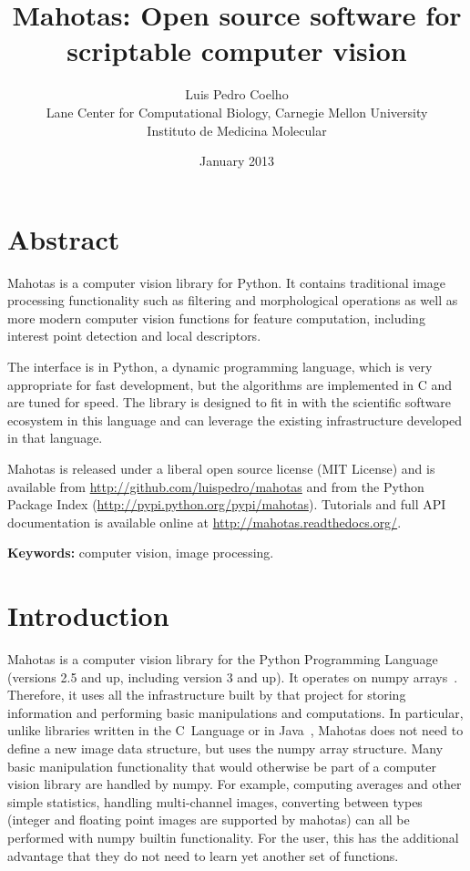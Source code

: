\documentclass{scrartcl}
\title{Mahotas: Open source software for scriptable computer vision}
\author{Luis Pedro Coelho\\
Lane Center for Computational Biology, Carnegie Mellon University\\
Instituto de Medicina Molecular}
\date{January 2013}
\newcommand*{\cpp}{{C\nolinebreak[4]\hspace{-.05em}\raisebox{.4ex}{\tiny\textbf{++}}}}
\begin{document}
\maketitle

\section*{Abstract}
Mahotas is a computer vision library for Python. It contains traditional image
processing functionality such as filtering and morphological operations as well
as more modern computer vision functions for feature computation, including
interest point detection and local descriptors.

The interface is in Python, a dynamic programming language, which is very
appropriate for fast development, but the algorithms are implemented in \cpp{}
and are tuned for speed. The library is designed to fit in with the scientific
software ecosystem in this language and can leverage the existing
infrastructure developed in that language.

Mahotas is released under a liberal open source license (MIT License) and is
available from \url{http://github.com/luispedro/mahotas} and from the Python Package
Index (\url{http://pypi.python.org/pypi/mahotas}). Tutorials and full API
documentation is available online at \url{http://mahotas.readthedocs.org/}.

\textbf{Keywords:} computer vision, image processing.

\section{Introduction}

Mahotas is a computer vision library for the Python Programming Language
(versions 2.5 and up, including version 3 and up). It operates on numpy
arrays~\citep{numpystructure}. Therefore, it uses all the infrastructure built
by that project for storing information and performing basic manipulations and
computations. In particular, unlike libraries written in the C~Language or in
Java~\citep{Pietzsch15112012,Marcel:2010:TMP:1873951.1874254}, Mahotas does not need to define a
new image data structure, but uses the numpy array structure. Many basic
manipulation functionality that would otherwise be part of a computer vision
library are handled by numpy. For example, computing averages and other simple
statistics, handling multi-channel images, converting between types (integer
and floating point images are supported by mahotas) can all be performed with
numpy builtin functionality. For the user, this has the additional advantage
that they do not need to learn yet another set of functions.
\end{document}
